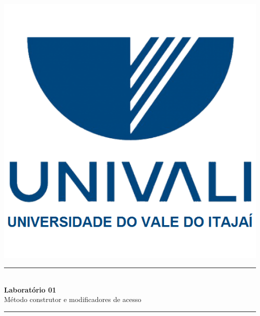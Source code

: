 \documentclass[11pt]{../../classes/univaliarticle}
\begin{document}
\begin{titlepage}
    \begin{center}
        \includegraphics[scale=.7]{../../classes/imagens/logo-univali.png}
        \vspace{4cm}

        \rule{\linewidth}{0.5pt} \\[6pt]

        {\huge \bfseries Laboratório 01}\\[3pt]

        {\large  Método construtor e modificadores de acesso}\\

        \rule{\linewidth}{2pt}  \\[10pt]
        \vspace{1cm}
    \end{center}

    \begin{minipage}{.9\linewidth}


\end{minipage}
\end{titlepage}
\end{document}
